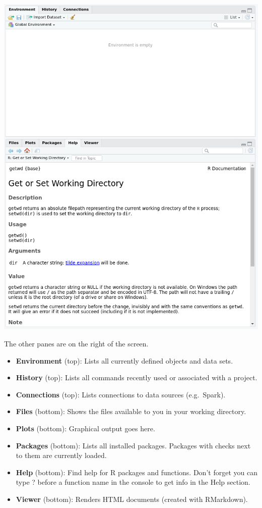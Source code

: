 \documentclass[]{article}
\providecommand{\tightlist}{%
  \setlength{\itemsep}{0pt}\setlength{\parskip}{0pt}}
\begin{document}
\begin{center}\includegraphics[width=0.9\linewidth]{images/other-panes} \end{center}

The other panes are on the right of the screen.

\begin{itemize}
\tightlist
\item
  \textbf{Environment} (top): Lists all currently defined objects and
  data sets.
\item
  \textbf{History} (top): Lists all commands recently used or associated
  with a project.
\item
  \textbf{Connections} (top): Lists connections to data sources
  (e.g.~Spark).
\item
  \textbf{Files} (bottom): Shows the files available to you in your
  working directory.
\item
  \textbf{Plots} (bottom): Graphical output goes here.
\item
  \textbf{Packages} (bottom): Lists all installed packages. Packages
  with checks next to them are currently loaded.
\item
  \textbf{Help} (bottom): Find help for R packages and functions. Don't
  forget you can type ? before a function name in the console to get
  info in the Help section.
\item
  \textbf{Viewer} (bottom): Renders HTML documents (created with
  RMarkdown).
\end{itemize}
\end{document}
